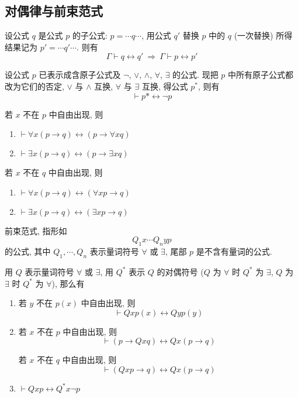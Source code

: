 \documentclass[
    mode=hazy,
    color=blue,
    device=normal,
    lang=cn
]{elegantnote}
\begin{document}
\subsection{对偶律与前束范式}
\begin{theorem}[子公式的等价可替换性]
    设公式 $q$ 是公式 $p$ 的子公式: $p = \cdots q \cdots$, 用公式 $q'$ 替换 $p$ 中的 $q$ (一次替换) 所得结果记为 $p' = \cdots q'\cdots$. 则有
    $$
        \Gamma\vdash q\leftrightarrow q' \ \Rightarrow\  \Gamma\vdash p\leftrightarrow p'
    $$
\end{theorem}
\begin{theorem}[对偶律]
    设公式 $p$ 已表示成含原子公式及 $\lnot$, $\lor$, $\land$, $\forall$, $\exists$ 的公式. 现把 $p$ 中所有原子公式都改为它们的否定, $\lor$ 与 $\land$ 互换, $\forall$ 与 $\exists$ 互换, 得公式 $p^*$, 则有
    $$
        \vdash p*\leftrightarrow \lnot p
    $$
\end{theorem}
\begin{proposition}
    若 $x$ 不在 $p$ 中自由出现, 则
    \begin{enumerate}[label = $\arabic*^\circ$]
        \item $\vdash \forall x (p\to q)\leftrightarrow (p\to \forall x q)$
        \item $\vdash \exists x (p\to q)\leftrightarrow (p\to \exists x q)$
    \end{enumerate}
    若 $x$ 不在 $q$ 中自由出现, 则
    \begin{enumerate}[label = $\arabic*^\circ$]
        \item $\vdash \forall x (p\to q)\leftrightarrow (\forall x p\to q)$
        \item $\vdash \exists x (p\to q)\leftrightarrow (\exists x p\to q)$
    \end{enumerate}
\end{proposition}
\begin{definition}[前束范式]
    前束范式, 指形如
    $$
        Q_1 x\cdots Q_n y p
    $$
    的公式, 其中 $Q_1, \cdots, Q_n$ 表示量词符号 $\forall$ 或 $\exists$, 尾部 $p$ 是不含有量词的公式.
\end{definition}
\begin{proposition}
    用 $Q$ 表示量词符号 $\forall$ 或 $\exists$, 用 $Q^*$ 表示 $Q$ 的对偶符号 ($Q$ 为 $\forall$ 时 $Q^*$ 为 $\exists$, $Q$ 为 $\exists$ 时 $Q^*$ 为 $\forall$), 那么有
    \begin{enumerate}[label = $\arabic*^\circ$]
        \item 若 $y$ 不在 $p(x)$ 中自由出现, 则 $$\vdash Qxp(x)\leftrightarrow Qyp(y)$$
        \item 若 $x$ 不在 $p$ 中自由出现, 则 $$\vdash (p\to Qxq)\leftrightarrow Qx(p\to q)$$

              若 $x$ 不在 $q$ 中自由出现, 则 $$\vdash (Qxp\to q)\leftrightarrow Qx(p\to q)$$
        \item $\vdash Qxp\leftrightarrow Q^*x\lnot p$
    \end{enumerate}
\end{proposition}
\end{document}
